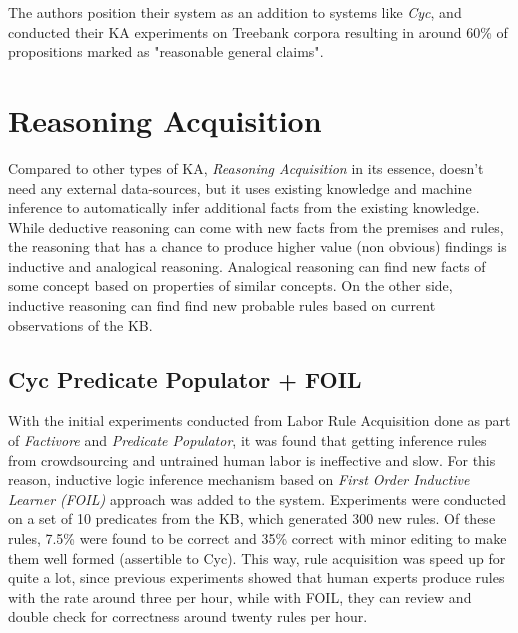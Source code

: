 The authors position their system as an addition to systems like \emph{Cyc}, and
conducted their KA experiments on Treebank corpora resulting in around 60\% of
propositions marked as "reasonable general claims"\parencite{Schubert2003}. 

\section{Reasoning Acquisition}
\label{section:r:reasoningacq}
Compared to other types of KA, \emph{Reasoning Acquisition} in its essence,
doesn't need any external data-sources, but it uses existing knowledge and
machine inference to automatically infer additional facts from the existing
knowledge. While deductive reasoning can come with new facts from the premises 
and rules, the reasoning that has a chance to produce higher value (non obvious)
findings is inductive and analogical reasoning. Analogical reasoning can find
new facts of some concept based on properties of similar concepts. On the other
side, inductive reasoning can find find new probable rules based on current 
observations of the KB.

\subsection {Cyc Predicate Populator + FOIL}
With the initial experiments conducted from Labor Rule Acquisition done as part
of \emph{Factivore} and \emph{Predicate Populator}\parencite{Witbrock2005}, it 
was found that getting inference rules from crowdsourcing and untrained
human labor is ineffective and slow. For this reason, inductive logic 
inference mechanism based on \emph{First Order Inductive Learner (FOIL)}
approach
\parencite{Quinlan1995} was added to the system. Experiments were conducted on
a set of 10 predicates from the KB, which generated 300 new rules. Of these
rules, 7.5\% were found to be correct and 35\% correct with minor editing to
make them well formed (assertible to Cyc). This way, rule acquisition was speed
up for quite a lot, since previous experiments showed that human experts produce
rules with the rate around three per hour, while with FOIL, they can review
and double check for correctness around twenty rules per hour.

